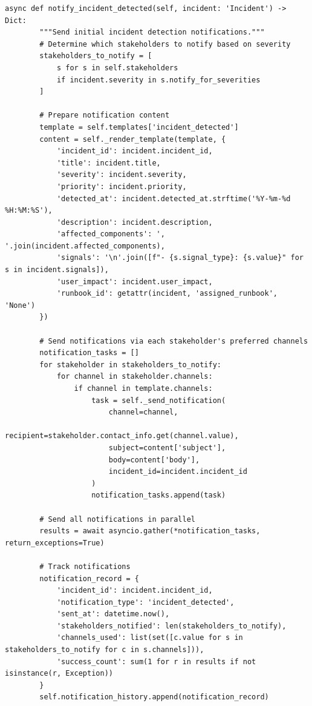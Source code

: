 \begin{lstlisting}[style=python, caption={Incident communication with multi-channel notifications}]
    async def notify_incident_detected(self, incident: 'Incident') -> Dict:
        """Send initial incident detection notifications."""
        # Determine which stakeholders to notify based on severity
        stakeholders_to_notify = [
            s for s in self.stakeholders
            if incident.severity in s.notify_for_severities
        ]

        # Prepare notification content
        template = self.templates['incident_detected']
        content = self._render_template(template, {
            'incident_id': incident.incident_id,
            'title': incident.title,
            'severity': incident.severity,
            'priority': incident.priority,
            'detected_at': incident.detected_at.strftime('%Y-%m-%d %H:%M:%S'),
            'description': incident.description,
            'affected_components': ', '.join(incident.affected_components),
            'signals': '\n'.join([f"- {s.signal_type}: {s.value}" for s in incident.signals]),
            'user_impact': incident.user_impact,
            'runbook_id': getattr(incident, 'assigned_runbook', 'None')
        })

        # Send notifications via each stakeholder's preferred channels
        notification_tasks = []
        for stakeholder in stakeholders_to_notify:
            for channel in stakeholder.channels:
                if channel in template.channels:
                    task = self._send_notification(
                        channel=channel,
                        recipient=stakeholder.contact_info.get(channel.value),
                        subject=content['subject'],
                        body=content['body'],
                        incident_id=incident.incident_id
                    )
                    notification_tasks.append(task)

        # Send all notifications in parallel
        results = await asyncio.gather(*notification_tasks, return_exceptions=True)

        # Track notifications
        notification_record = {
            'incident_id': incident.incident_id,
            'notification_type': 'incident_detected',
            'sent_at': datetime.now(),
            'stakeholders_notified': len(stakeholders_to_notify),
            'channels_used': list(set([c.value for s in stakeholders_to_notify for c in s.channels])),
            'success_count': sum(1 for r in results if not isinstance(r, Exception))
        }
        self.notification_history.append(notification_record)


\end{lstlisting}
